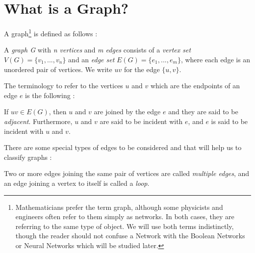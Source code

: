 


\section{What is a Graph?}
A graph\footnote{Mathematicians prefer the term graph, although some physicists and engineers often refer to them simply as networks. In both cases, they are referring to the same type of object. We will use both terms indistinctly, though the reader should not confuse a Network with the Boolean Networks or Neural Networks which will be studied later.} is defined as follows \cite{douglas}:\\
\begin{defn}
\label{graphdef}
	A \textit{graph G} with \textit{n vertices} and \textit{m edges} consists of a \textit{vertex set} $ V(G)=\{v_{1},...,v_{n}\} $ and an \textit{edge set} $E(G)=\{e_{1},...,e_{m}\} $, where each edge is an unordered pair of vertices. We write $ uv $ for the edge $ \{u,v\} $.\\
\end{defn}

The terminology to refer to the vertices $u$ and $v$ which are the endpoints of an edge $e$ is the following \cite{wilsonwatkins}:\\
\begin{defn}
\label{adjorinc}
If $ uv\in E(G) $, then $ u $ and $ v $ are joined by the edge $e$ and they are said to be \textit{adjacent}. Furthermore, $u$ and $v$ are said to be incident with $e$, and $e$ is said to be incident with $u$ and $v$. 
\end{defn}

There are some special types of edges to be considered and that will help us to classify graphs \cite{wilsonwatkins}:\\

\begin{defn}
	Two or more edges joining the same pair of vertices are called \textit{multiple edges}, and an edge joining a vertex to itself is called a \textit{loop}.\\
\end{defn}


